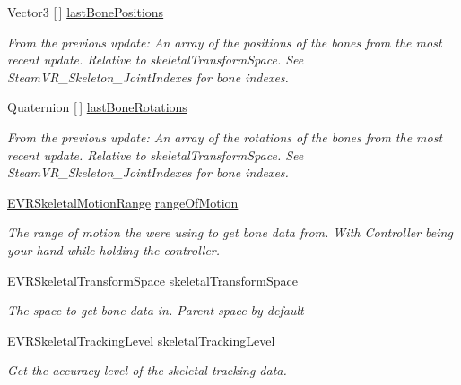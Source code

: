 \begin{DoxyCompactItemize}
Vector3 \mbox{[}$\,$\mbox{]} \mbox{\hyperlink{class_valve_1_1_v_r_1_1_steam_v_r___action___skeleton_aff8d8bd91c2273d645d3e15ab40346d3}{last\+Bone\+Positions}}
\begin{DoxyCompactList}\small\item\em From the previous update\+: An array of the positions of the bones from the most recent update. Relative to skeletal\+Transform\+Space. See Steam\+V\+R\+\_\+\+Skeleton\+\_\+\+Joint\+Indexes for bone indexes. \end{DoxyCompactList}\item 
Quaternion \mbox{[}$\,$\mbox{]} \mbox{\hyperlink{class_valve_1_1_v_r_1_1_steam_v_r___action___skeleton_a58a7bac7e74072d967ac07c936ec58f3}{last\+Bone\+Rotations}}
\begin{DoxyCompactList}\small\item\em From the previous update\+: An array of the rotations of the bones from the most recent update. Relative to skeletal\+Transform\+Space. See Steam\+V\+R\+\_\+\+Skeleton\+\_\+\+Joint\+Indexes for bone indexes. \end{DoxyCompactList}\item 
\mbox{\hyperlink{namespace_valve_1_1_v_r_affc8d18345f8f5d36f1ae7b4ce534500}{E\+V\+R\+Skeletal\+Motion\+Range}} \mbox{\hyperlink{class_valve_1_1_v_r_1_1_steam_v_r___action___skeleton_a51d29eb0cba3a7b9d50da1b8e1ea4635}{range\+Of\+Motion}}
\begin{DoxyCompactList}\small\item\em The range of motion the we\textquotesingle{}re using to get bone data from. With Controller being your hand while holding the controller. \end{DoxyCompactList}\item 
\mbox{\hyperlink{namespace_valve_1_1_v_r_a916744fb3fc7b8e8ba224fba9bee6de4}{E\+V\+R\+Skeletal\+Transform\+Space}} \mbox{\hyperlink{class_valve_1_1_v_r_1_1_steam_v_r___action___skeleton_a11e85fa5ab977aa3a4c4e7e1b6d01c8e}{skeletal\+Transform\+Space}}
\begin{DoxyCompactList}\small\item\em The space to get bone data in. Parent space by default \end{DoxyCompactList}\item 
\mbox{\hyperlink{namespace_valve_1_1_v_r_a6f46bd50fb65255d6537ab32a6bddc30}{E\+V\+R\+Skeletal\+Tracking\+Level}} \mbox{\hyperlink{class_valve_1_1_v_r_1_1_steam_v_r___action___skeleton_aa9ab0a739929c7ac378974d7f9a71c91}{skeletal\+Tracking\+Level}}
\begin{DoxyCompactList}\small\item\em Get the accuracy level of the skeletal tracking data. 


\end{DoxyCompactList}
\end{DoxyCompactItemize}
